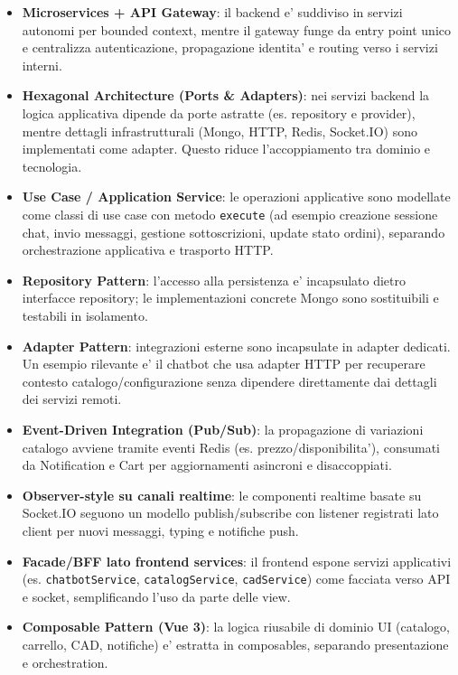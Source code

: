 \begin{itemize}
\item \textbf{Microservices + API Gateway}: il backend e' suddiviso in servizi autonomi per bounded context, mentre il gateway funge da entry point unico e centralizza autenticazione, propagazione identita' e routing verso i servizi interni.

\item \textbf{Hexagonal Architecture (Ports \& Adapters)}: nei servizi backend la logica applicativa dipende da porte astratte (es. repository e provider), mentre dettagli infrastrutturali (Mongo, HTTP, Redis, Socket.IO) sono implementati come adapter. Questo riduce l'accoppiamento tra dominio e tecnologia.

\item \textbf{Use Case / Application Service}: le operazioni applicative sono modellate come classi di use case con metodo \texttt{execute} (ad esempio creazione sessione chat, invio messaggi, gestione sottoscrizioni, update stato ordini), separando orchestrazione applicativa e trasporto HTTP.

\item \textbf{Repository Pattern}: l'accesso alla persistenza e' incapsulato dietro interfacce repository; le implementazioni concrete Mongo sono sostituibili e testabili in isolamento.

\item \textbf{Adapter Pattern}: integrazioni esterne sono incapsulate in adapter dedicati. Un esempio rilevante e' il chatbot che usa adapter HTTP per recuperare contesto catalogo/configurazione senza dipendere direttamente dai dettagli dei servizi remoti.

\item \textbf{Event-Driven Integration (Pub/Sub)}: la propagazione di variazioni catalogo avviene tramite eventi Redis (es. prezzo/disponibilita'), consumati da Notification e Cart per aggiornamenti asincroni e disaccoppiati.

\item \textbf{Observer-style su canali realtime}: le componenti realtime basate su Socket.IO seguono un modello publish/subscribe con listener registrati lato client per nuovi messaggi, typing e notifiche push.

\item \textbf{Facade/BFF lato frontend services}: il frontend espone servizi applicativi (es. \texttt{chatbotService}, \texttt{catalogService}, \texttt{cadService}) come facciata verso API e socket, semplificando l'uso da parte delle view.

\item \textbf{Composable Pattern (Vue 3)}: la logica riusabile di dominio UI (catalogo, carrello, CAD, notifiche) e' estratta in composables, separando presentazione e orchestration.
\end{itemize}

